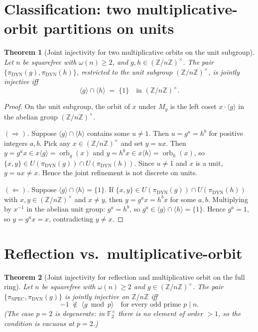 \documentclass[11pt,reqno]{amsart}
\theoremstyle{plain}
\newtheorem{theorem}{Theorem}[section]
\theoremstyle{definition}
\theoremstyle{remark}
\DeclareMathOperator{\orb}{orb}
\DeclareMathOperator{\spec}{SPEC}
\DeclareMathOperator{\dyn}{DYN}
\newcommand{\Z}{\mathbb{Z}}
\newcommand{\F}{\mathbb{F}}
\begin{document}
\section{Classification: two multiplicative-orbit partitions on units}\label{sec:mm}

\begin{theorem}[Joint injectivity for two multiplicative orbits on
the unit subgroup]\label{thm:mm}
Let $n$ be squarefree with $\omega(n) \ge 2$, and $g, h \in
(\Z/n\Z)^{\times}$. The pair $\{\pi_{\dyn}(g), \pi_{\dyn}(h)\}$,
restricted to the unit subgroup $(\Z/n\Z)^{\times}$, is jointly
injective iff
\[
  \langle g \rangle \cap \langle h \rangle \;=\; \{1\}
  \quad \text{in } (\Z/n\Z)^{\times}.
\]
\end{theorem}

\begin{proof}
On the unit subgroup, the orbit of $x$ under $M_{g}$ is the left
coset $x \cdot \langle g \rangle$ in the abelian group
$(\Z/n\Z)^{\times}$.

\textit{$(\Rightarrow)$.} Suppose $\langle g \rangle \cap \langle h
\rangle$ contains some $u \ne 1$. Then $u = g^{a} = h^{b}$ for
positive integers $a, b$. Pick any $x \in (\Z/n\Z)^{\times}$ and set
$y = u x$. Then $y = g^{a} x \in x \langle g \rangle = \orb_{g}(x)$
and $y = h^{b} x \in x \langle h \rangle = \orb_{h}(x)$, so
$\{x, y\} \in U(\pi_{\dyn}(g)) \cap U(\pi_{\dyn}(h))$. Since $u \ne 1$
and $x$ is a unit, $y = u x \ne x$. Hence the joint refinement is
not discrete on units.

\textit{$(\Leftarrow)$.} Suppose $\langle g \rangle \cap \langle h
\rangle = \{1\}$. If $\{x, y\} \in U(\pi_{\dyn}(g)) \cap
U(\pi_{\dyn}(h))$ with $x, y \in (\Z/n\Z)^{\times}$ and $x \ne y$,
then $y = g^{a} x = h^{b} x$ for some $a, b$. Multiplying by
$x^{-1}$ in the abelian unit group: $g^{a} = h^{b}$, so $g^{a} \in
\langle g \rangle \cap \langle h \rangle = \{1\}$. Hence $g^{a} = 1$,
so $y = g^{a} x = x$, contradicting $y \ne x$.
\end{proof}

\section{Reflection vs.\ multiplicative-orbit}\label{sec:specdyn}

\begin{theorem}[Joint injectivity for reflection and multiplicative
orbit on the full ring]\label{thm:specdyn}
Let $n$ be squarefree with $\omega(n) \ge 2$ and $g \in (\Z/n\Z)^{\times}$.
The pair $\{\pi_{\spec}, \pi_{\dyn}(g)\}$ is jointly injective on
$\Z/n\Z$ iff
\[
  -1 \;\notin\; \langle g \bmod p \rangle
  \quad \text{for every odd prime } p \mid n.
\]
(The case $p = 2$ is degenerate: in $\F_{2}^{\times}$ there is no
element of order $> 1$, so the condition is vacuous at $p = 2$.)
\end{theorem}
\end{document}
